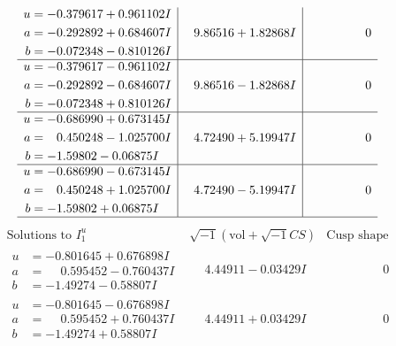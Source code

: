 \documentclass[1p]{elsarticle_modified}
\theoremstyle{definition}
\newcommand{\I}{\sqrt{-1}}
\begin{document}
$$\begin{array}{c|c|c}
\begin{aligned}
u &= -0.379617 + 0.961102 I \\
a &= -0.292892 + 0.684607 I \\
b &= -0.072348 - 0.810126 I\end{aligned}
 & \phantom{-}9.86516 + 1.82868 I & \phantom{-0.000000 } 0 \\ \hline\begin{aligned}
u &= -0.379617 - 0.961102 I \\
a &= -0.292892 - 0.684607 I \\
b &= -0.072348 + 0.810126 I\end{aligned}
 & \phantom{-}9.86516 - 1.82868 I & \phantom{-0.000000 } 0 \\ \hline\begin{aligned}
u &= -0.686990 + 0.673145 I \\
a &= \phantom{-}0.450248 - 1.025700 I \\
b &= -1.59802 - 0.06875 I\end{aligned}
 & \phantom{-}4.72490 + 5.19947 I & \phantom{-0.000000 } 0 \\ \hline\begin{aligned}
u &= -0.686990 - 0.673145 I \\
a &= \phantom{-}0.450248 + 1.025700 I \\
b &= -1.59802 + 0.06875 I\end{aligned}
 & \phantom{-}4.72490 - 5.19947 I & \phantom{-0.000000 } 0\\
 \hline 
 \end{array}$$\newpage$$\begin{array}{c|c|c}  
\text{Solutions to }I^u_{1}& \I (\text{vol} + \sqrt{-1}CS) & \text{Cusp shape}\\
 \hline 
\begin{aligned}
u &= -0.801645 + 0.676898 I \\
a &= \phantom{-}0.595452 - 0.760437 I \\
b &= -1.49274 - 0.58807 I\end{aligned}
 & \phantom{-}4.44911 - 0.03429 I & \phantom{-0.000000 } 0 \\ \hline\begin{aligned}
u &= -0.801645 - 0.676898 I \\
a &= \phantom{-}0.595452 + 0.760437 I \\
b &= -1.49274 + 0.58807 I\end{aligned}
 & \phantom{-}4.44911 + 0.03429 I & \phantom{-0.000000 } 0 \\ \hline\begin{aligned}

\end{aligned}
\end{array}$$
\end{document}
